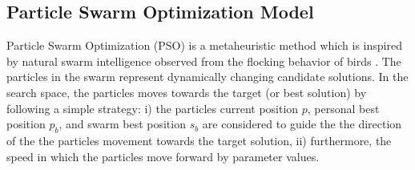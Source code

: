\subsection{Particle Swarm Optimization Model}
Particle Swarm Optimization (PSO) is a metaheuristic method \cite{} which is inspired by natural swarm intelligence \cite{} observed from the flocking behavior of birds \cite{}. The particles in the swarm represent dynamically changing candidate solutions. In the search space, the particles moves towards the target (or best solution) by following a simple strategy: i) the particles current position $p$, personal best position $p_b$, and swarm best position $s_b$ are considered to guide the the direction of the the particles movement towards the target solution, ii) furthermore, the speed in which the particles move forward by parameter values.
